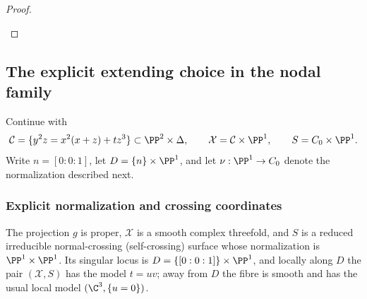 \begin{proof}
\begin{enumerate}[label={$\langle1\rangle$\arabic*.},leftmargin=*]
\end{enumerate}
\end{proof}

\subsection{The explicit extending choice in the nodal family}
Continue with
\[
\mathcal C=\{y^2z=x^2(x+z)+tz^3\}\subset\PP^2\times\Delta,
\qquad \mathcal X=\mathcal C\times\PP^1,
\qquad S=C_0\times\PP^1.
\]
Write $n=[0:0:1]$, let $D=\{n\}\times\PP^1$, and let
$\nu:\PP^1\to C_0$ denote the normalization described next.
\subsubsection*{Explicit normalization and crossing coordinates}

The projection $g$ is proper, $\mathcal X$ is a smooth complex threefold,
  and $S$ is a reduced irreducible normal-crossing (self-crossing) surface whose normalization
is $\PP^1\times\PP^1$.  Its singular locus is
\(D=\{[0:0:1]\}\times\PP^1\), and locally along $D$ the pair $(\mathcal X,S)$
has the model $t=uv$; away from $D$ the fibre is smooth and has the usual
local model $(\C^3,\{u=0\})$.


